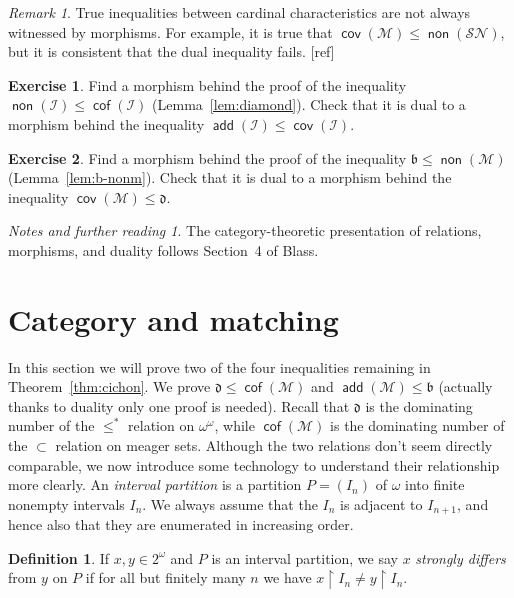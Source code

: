 \documentclass[11pt,oneside]{amsbook}
\newcommand{\Meager}{\mathcal M}
\DeclareMathOperator{\add}{\mathsf{add}}
\DeclareMathOperator{\non}{\mathsf{non}}
\DeclareMathOperator{\cov}{\mathsf{cov}}
\DeclareMathOperator{\cof}{\mathsf{cof}}
\theoremstyle{definition}
\newtheorem{exerc}{Exercise}[section]
\theoremstyle{plain}
\theoremstyle{definition}
\newtheorem{defn}[thm]{Definition}
\theoremstyle{remark}
\newtheorem{rem}[thm]{Remark}
\newtheorem*{notes}{Notes and further reading}
\begin{document}
\begin{rem}
  True inequalities between cardinal characteristics are not always witnessed by morphisms. For example, it is true that $\cov(\Meager)\leq\non(\mathcal{SN})$, but it is consistent that the dual inequality fails. [ref]
\end{rem}

\begin{exerc}
  Find a morphism behind the proof of the inequality $\non(\mathcal I)\leq\cof(\mathcal I)$ (Lemma~\ref{lem:diamond}). Check that it is dual to a morphism behind the inequality $\add(\mathcal I)\leq\cov(\mathcal I)$.
\end{exerc}

\begin{exerc}
  Find a morphism behind the proof of the inequality $\mathfrak b\leq\non(\Meager)$ (Lemma~\ref{lem:b-nonm}). Check that it is dual to a morphism behind the inequality $\cov(\Meager)\leq\mathfrak d$.
\end{exerc}

\begin{notes}
  The category-theoretic presentation of relations, morphisms, and duality follows Section~4 of Blass.
\end{notes}


\section{Category and matching}

In this section we will prove two of the four inequalities remaining in Theorem~\ref{thm:cichon}. We prove $\mathfrak d\leq\cof(\Meager)$ and $\add(\Meager)\leq\mathfrak b$ (actually thanks to duality only one proof is needed). Recall that $\mathfrak d$ is the dominating number of the $\leq^*$ relation on $\omega^\omega$, while $\cof(\Meager)$ is the dominating number of the $\subset$ relation on meager sets. Although the two relations don't seem directly comparable, we now introduce some technology to understand their relationship more clearly. An \emph{interval partition} is a partition $P=(I_n)$ of $\omega$ into finite nonempty intervals $I_n$. We always assume that the $I_n$ is adjacent to $I_{n+1}$, and hence also that they are enumerated in increasing order.

\begin{defn}
  If $x,y\in2^\omega$ and $P$ is an interval partition, we say $x$ \emph{strongly differs} from $y$ on $P$ if for all but finitely many $n$ we have $x\restriction I_n\neq y\restriction I_n$.
\end{defn}
\end{document}
